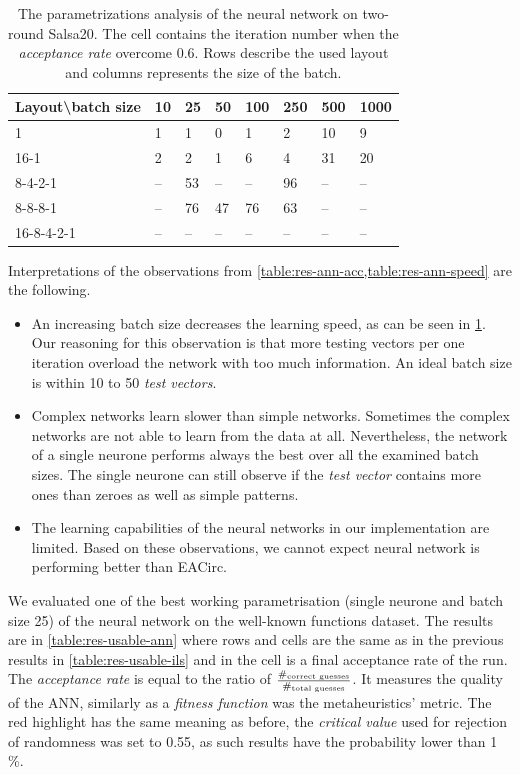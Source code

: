 \documentclass[
    digital,    %
    oneside,    %
    color,
    11pt,
    nocover,
    notable,
    nolof,
    nolot,
]{fithesis3}
\begin{document}
\begin{table}[t]
\centering
\begin{tabular}{l|l l l l l l l}
\textbf{\large Layout\textbackslash{}batch size} & \textbf{\large 10} & \textbf{\large 25} & \textbf{\large 50} & \textbf{\large 100} & \textbf{\large 250} & \textbf{\large 500} & \textbf{\large 1000}\\ \hline
1          & 1 & 1 & 0 & 1 & 2 & 10 & 9 \\
16-1       & 2 & 2 & 1 & 6 & 4 & 31 & 20 \\
8-4-2-1    & -- & 53 & -- & -- & 96 & -- & -- \\ 
8-8-8-1    & -- & 76 & 47 & 76 & 63 & -- & -- \\
16-8-4-2-1 & -- & -- & -- & -- & -- & -- & --  

\end{tabular}
\caption{The parametrizations analysis of the neural network on two-round Salsa20. The cell contains the iteration number when the \textit{acceptance rate} overcome 0.6. Rows describe the used layout and columns represents the size of the batch.}
\label{table:res-ann-speed}
\end{table}

Interpretations of the observations from \cref{table:res-ann-acc,table:res-ann-speed} are the following.

\begin{itemize}
    \item An increasing batch size decreases the learning speed, as can be seen in \cref{table:res-ann-speed}. Our reasoning for this observation is that more testing vectors per one iteration overload the network with too much information. An ideal batch size is within 10 to 50 \textit{test vectors}.
    \item Complex networks learn slower than simple networks. Sometimes the complex networks are not able to learn from the data at all. Nevertheless, the network of a single neurone performs always the best over all the examined batch sizes. The single neurone can still observe if the \textit{test vector} contains more ones than zeroes as well as simple patterns.
    \item The learning capabilities of the neural networks in our implementation are limited. Based on these observations, we cannot expect neural network is performing better than EACirc.
\end{itemize}

We evaluated one of the best working parametrisation (single neurone and batch size 25) of the neural network on the well-known functions dataset. The results are in \cref{table:res-usable-ann} where rows and cells are the same as in the previous results in \cref{table:res-usable-ils} and in the cell is a final acceptance rate of the run. The \textit{acceptance rate} is equal to the ratio of $\frac{\#_{\textnormal{correct guesses}}}{\#_{\textnormal{total guesses}}}$. It measures the quality of the ANN, similarly as a \textit{fitness function} was the metaheuristics' metric. The red highlight has the same meaning as before, the \textit{critical value} used for rejection of randomness was set to 0.55, as such results have the probability lower than 1\,\%.
\end{document}
